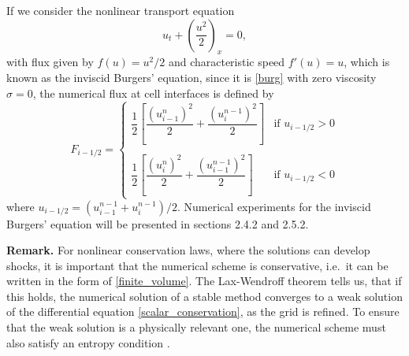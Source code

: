 \documentclass[../include.tex]{subfiles}
\begin{document}
If we consider the nonlinear transport equation
\begin{equation}
	u_t + \left(\frac{u^2}{2}\right)_x = 0, 
	\label{inviscid}
\end{equation}
with flux given by $ f(u) = u^2/2 $ and characteristic speed $ f'(u) = u $, which is known as the inviscid Burgers' equation, since it is \eqref{burg} with zero viscosity $ \sigma = 0 $, the numerical flux at cell interfaces is defined by
\begin{equation}
	\label{basic_iioe_burgers_flux}
	F_{i - 1/2} = 
\begin{cases}
	\dfrac{1}{2}\left[\dfrac{(u^n_{i-1})^2}{2} + \dfrac{(u^{n-1}_{i})^2}{2} \right] &  \text{if } u_{i-1/2} > 0\\
	\\
\dfrac{1}{2}\left[\dfrac{(u^n_{i})^2}{2} + \dfrac{(u^{n-1}_{i-1})^2}{2} \right] &  \text{if } u_{i-1/2} < 0
\end{cases}
\end{equation}
where $ u_{i-1/2} = (u_{i-1}^{n-1} + u_{i}^{n-1})/2 $. Numerical experiments for the inviscid Burgers' equation will be presented in sections 2.4.2 and 2.5.2.
\par \textbf{Remark.} For nonlinear conservation laws, where the solutions can develop shocks, it is important that the numerical scheme is conservative, i.e.\ it can be written in the form of \eqref{finite_volume}. The Lax-Wendroff theorem tells us, that if this holds, the numerical solution of a stable method converges to a weak solution of the differential equation \eqref{scalar_conservation}, as the grid is refined. To ensure that the weak solution is a physically relevant one, the numerical scheme must also satisfy an entropy condition \cite{lev}.
\end{document}
